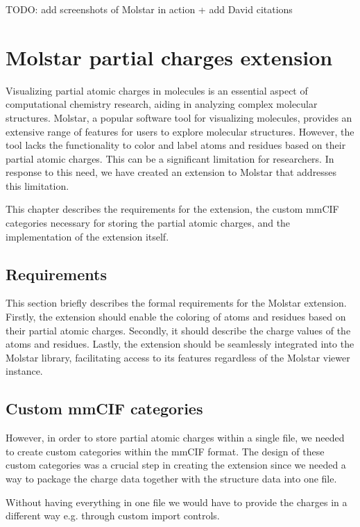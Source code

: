 \documentclass[
  digital,     %
  oneside,     %
  nosansbold,  %
  nocolorbold, %
  lof,         %
  lot,         %
]{fithesis4}
\begin{document}
TODO: add screenshots of Molstar in action + add David citations


\chapter{Molstar partial charges extension}

Visualizing partial atomic charges in molecules is an essential aspect of computational chemistry research, aiding in analyzing complex molecular structures. Molstar, a popular software tool for visualizing molecules, provides an extensive range of features for users to explore molecular structures. However, the tool lacks the functionality to color and label atoms and residues based on their partial atomic charges. This can be a significant limitation for researchers. In response to this need, we have created an extension to Molstar that addresses this limitation.

This chapter describes the requirements for the extension, the custom mmCIF categories necessary for storing the partial atomic charges, and the implementation of the extension itself.

\section{Requirements}

This section briefly describes the formal requirements for the Molstar extension. Firstly, the extension should enable the coloring of atoms and residues based on their partial atomic charges. Secondly, it should describe the charge values of the atoms and residues. Lastly, the extension should be seamlessly integrated into the Molstar library, facilitating access to its features regardless of the Molstar viewer instance.

\section{Custom mmCIF categories}
\label{section:custom_mmcif_categories}

However, in order to store partial atomic charges within a single file, we needed to create custom categories within the mmCIF format.
The design of these custom categories was a crucial step in creating the extension since we needed a way to package the charge data together with the structure data into one file.

Without having everything in one file we would have to provide the charges in a different way e.g. through custom import controls.
\end{document}
